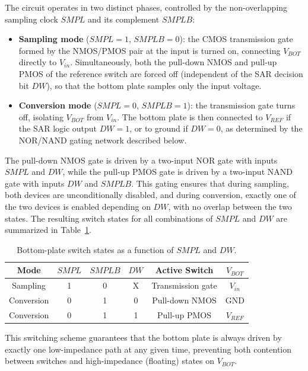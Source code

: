 The circuit operates in two distinct phases, controlled by the
non-overlapping sampling clock $SMPL$ and its complement $SMPLB$:

\begin{itemize}
	\item \textbf{Sampling mode} ($SMPL = 1$, $SMPLB = 0$): the CMOS
	transmission gate formed by the NMOS/PMOS pair at the input is turned
	on, connecting $V_{BOT}$ directly to $V_{in}$. Simultaneously, both the
	pull-down NMOS and pull-up PMOS of the reference switch are forced off
	(independent of the SAR decision bit $DW$), so that the bottom plate
	samples only the input voltage.
	
	\item \textbf{Conversion mode} ($SMPL = 0$, $SMPLB = 1$): the
	transmission gate turns off, isolating $V_{BOT}$ from $V_{in}$. The
	bottom plate is then connected to $V_{REF}$ if the SAR logic output
	$DW = 1$, or to ground if $DW = 0$, as determined by the NOR/NAND gating
	network described below.
\end{itemize}

The pull-down NMOS gate is driven by a two-input NOR gate with inputs
$SMPL$ and $DW$, while the pull-up PMOS gate is driven by a two-input NAND
gate with inputs $DW$ and $SMPLB$. This gating ensures that during sampling,
both devices are unconditionally disabled, and during conversion, exactly
one of the two devices is enabled depending on $DW$, with no overlap
between the two states. The resulting switch states for all combinations of
$SMPL$ and $DW$ are summarized in Table~\ref{tab:bottom_plate_truth}.

\begin{table}[h]
	\centering
	\caption{Bottom-plate switch states as a function of $SMPL$ and $DW$.}
	\label{tab:bottom_plate_truth}
	\begin{tabular}{@{}cccccc@{}}
		\toprule
		Mode & $SMPL$ & $SMPLB$ & $DW$ & Active Switch & $V_{BOT}$ \\
		\midrule
		Sampling    & 1 & 0 & X & Transmission gate         & $V_{in}$  \\
		Conversion  & 0 & 1 & 0 & Pull-down NMOS            & GND       \\
		Conversion  & 0 & 1 & 1 & Pull-up PMOS              & $V_{REF}$ \\
		\bottomrule
	\end{tabular}
\end{table}

This switching scheme guarantees that the bottom plate is always driven by
exactly one low-impedance path at any given time, preventing both
contention between switches and high-impedance (floating) states on
$V_{BOT}$.
